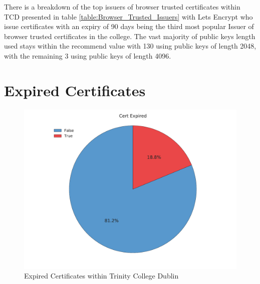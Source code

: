 \documentclass[a4wide,leqno,12pt]{report}
\begin{document}
\begin{table}[H]
\centering
{}
\caption{Browser Trusted Certificate Issuers Within Trinity College Dublin}
\label{table:Browser_Trusted_Issuers}
\end{table}
There is a breakdown of the top issuers of browser trusted certificates within TCD presented in table \ref{table:Browser_Trusted_Issuers} with Lets Encrypt who issue certificates with an expiry of 90 days \cite{LetsEncrypt} being the third most popular Issuer of browser trusted certificates in the college. The vast majority of public keys length used stays within the recommend value \cite{ssllabs} with 130 using public keys of length 2048, with the remaining 3 using public keys of length 4096.


\section{Expired Certificates}
\begin{figure}[H]
\centering
\includegraphics[scale=.45]{pdf_images/CertificateExpired}
\caption{Expired Certificates within Trinity College Dublin}
\label{fig:certExpired}
\end{figure}
\end{document}
